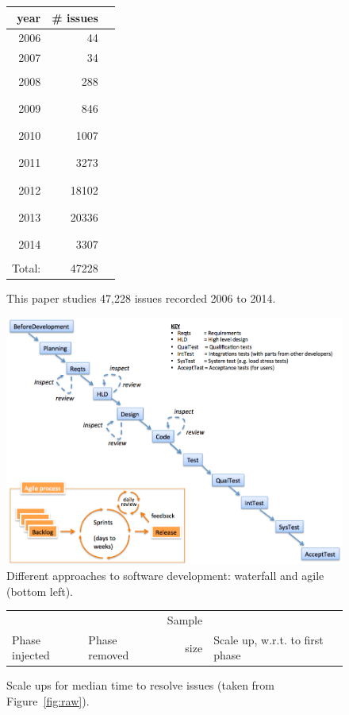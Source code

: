 \documentclass{sig-alternate}
\newcommand{\fig}[1]{Figure~\ref{fig:#1}}
\def\baselinestretch{1}
\begin{document}
 
\begin{figure}
\begin{center}
\scriptsize
\begin{tabular}{rrl}
year& \# issues&\\\hline
2006 &  44 &\\
2007 &  34 &\\
2008&  288 &\rule{1mm}{2mm}\\
2009&  846 &\rule{3mm}{2mm}\\
2010& 1007 &\rule{3mm}{2mm}\\
2011& 3273 &\rule{10mm}{2mm}\\
2012&18102 &\rule{45mm}{2mm}\\
2013&20336 &\rule{50mm}{2mm}\\
2014& 3307 & \rule{10mm}{2mm}\\\cline{1-2}
Total:&47228
\end{tabular}
\end{center}
\caption{This paper studies 47,228 issues recorded 2006 to 2014.}\label{fig:years}
\end{figure}
\begin{figure}[!t]
\begin{center}
\includegraphics[width=6in]{waterfall2.png}
\end{center}
\caption{Different approaches to software development:  waterfall and agile (bottom left).}
\end{figure}


\begin{figure}[!t]

\renewcommand{\baselinestretch}{0.7}
\small
\begin{center}
\begin{tabular}{ll|r|rl}
            &                  & Sample\\
Phase injected & Phase removed & size & \multicolumn{2}{l}{Scale up, w.r.t. to first phase}

\end{tabular}
\end{center}
\caption{Scale ups for median time to resolve issues (taken from \fig{raw}).}
\label{fig:scale}
\end{figure}
\end{document}
